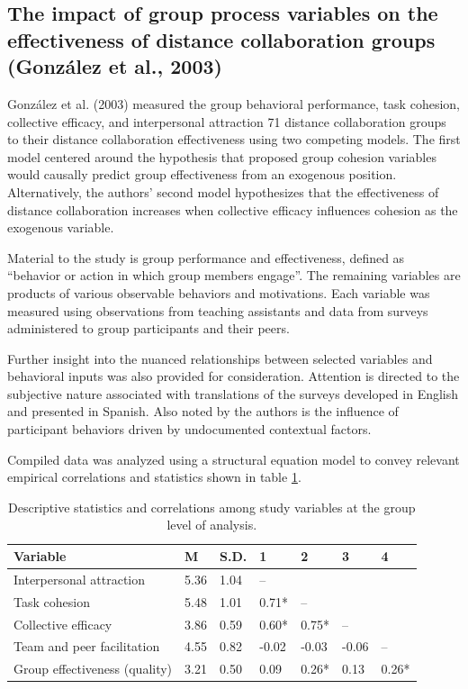 \documentclass[sn-nature]{sn-jnl}%
\theoremstyle{thmstyleone}%
\theoremstyle{thmstyletwo}%
\theoremstyle{thmstylethree}%
\begin{document}
\subsection{The impact of group process variables on the effectiveness of distance collaboration groups (González et al., 2003)\cite{gonzalez_impact_2003}}
González et al. (2003) measured the group behavioral performance, task cohesion, collective efficacy, and interpersonal attraction 71 distance collaboration groups to their distance collaboration effectiveness using two competing models. The first model centered around the hypothesis that proposed group cohesion variables would causally predict group effectiveness from an exogenous position. Alternatively, the authors’ second model hypothesizes that the effectiveness of distance collaboration increases when collective efficacy influences cohesion as the exogenous variable\cite{gonzalez_impact_2003}.

Material to the study is group performance and effectiveness, defined as “behavior or action in which group members engage”\cite{gonzalez_impact_2003}. The remaining variables are products of various observable behaviors and motivations. Each variable was measured using observations from teaching assistants and data from surveys administered to group participants and their peers.

Further insight into the nuanced relationships between selected variables and behavioral inputs was also provided for consideration. Attention is directed to the subjective nature associated with translations of the surveys developed in English and presented in Spanish. Also noted by the authors is the influence of participant behaviors driven by undocumented contextual factors.

Compiled data was analyzed using a structural equation model to convey relevant empirical correlations and statistics shown in table \ref{table:1}.\\ \begin{table}[h]
\centering
\begin{tabular}{l l l l l l l }
\hline
Variable & M & S.D. & 1 & 2 & 3 & 4 \\
\hline
Interpersonal attraction & 5.36 & 1.04 & – & & & \\

Task cohesion & 5.48 & 1.01 & 0.71* & – & & \\

Collective efficacy & 3.86 & 0.59 & 0.60* & 0.75* & – & \\

Team and peer facilitation & 4.55 & 0.82 & -0.02 & -0.03 & -0.06 & – \\

Group effectiveness (quality) & 3.21 & 0.50 & 0.09 & 0.26* & 0.13 & 0.26* \\
\hline
\end{tabular}
\caption{Descriptive statistics and correlations among study variables at the group level of analysis\cite{gonzalez_impact_2003}.}
\label{table:1}
\end{table} 
\end{document}
